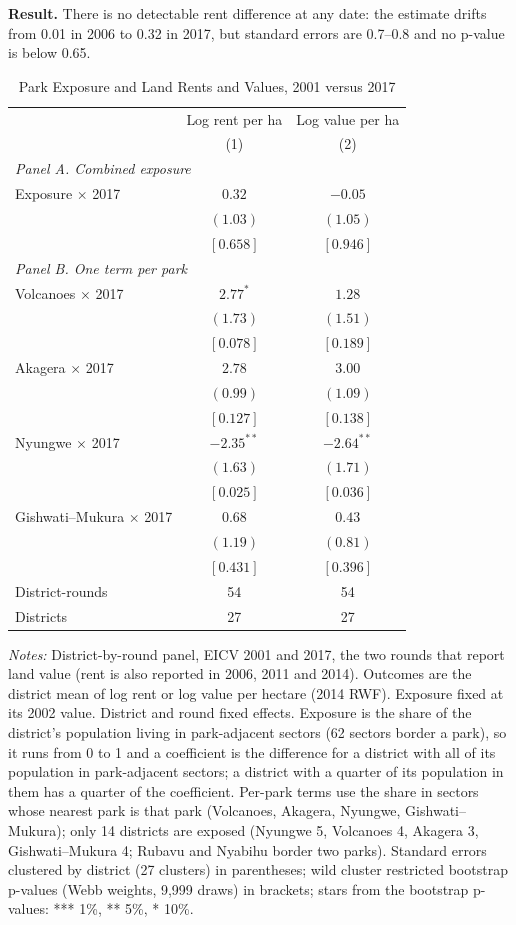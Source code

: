 \documentclass[11pt]{article}
\begin{document}
\textbf{Result.} There is no detectable rent difference at any date: the estimate drifts from 0.01 in 2006 to 0.32 in 2017, but standard errors are 0.7--0.8 and no p-value is below 0.65.
\clearpage
\begin{table}[H]
\centering\small\setlength{\tabcolsep}{4pt}
\caption{Park Exposure and Land Rents and Values, 2001 versus 2017}
\label{tab:land_firstlast}
\begin{tabular}{lcc}
\toprule
 & Log rent per ha & Log value per ha \\
 & (1) & (2) \\
\midrule
\multicolumn{3}{l}{\textit{Panel A. Combined exposure}} \\
Exposure $\times$ 2017 & $0.32$ & $-0.05$ \\
 & $(1.03)$ & $(1.05)$ \\
 & $[0.658]$ & $[0.946]$ \\
\multicolumn{3}{l}{\textit{Panel B. One term per park}} \\
Volcanoes $\times$ 2017 & $2.77^{*}$ & $1.28$ \\
 & $(1.73)$ & $(1.51)$ \\
 & $[0.078]$ & $[0.189]$ \\
Akagera $\times$ 2017 & $2.78$ & $3.00$ \\
 & $(0.99)$ & $(1.09)$ \\
 & $[0.127]$ & $[0.138]$ \\
Nyungwe $\times$ 2017 & $-2.35^{**}$ & $-2.64^{**}$ \\
 & $(1.63)$ & $(1.71)$ \\
 & $[0.025]$ & $[0.036]$ \\
Gishwati--Mukura $\times$ 2017 & $0.68$ & $0.43$ \\
 & $(1.19)$ & $(0.81)$ \\
 & $[0.431]$ & $[0.396]$ \\
\midrule
District-rounds & 54 & 54 \\
Districts & 27 & 27 \\
\bottomrule
\end{tabular}
\begin{minipage}{0.95\textwidth}\footnotesize
\textit{Notes:} District-by-round panel, EICV 2001 and 2017, the two rounds that report land value (rent is also reported in 2006, 2011 and 2014). Outcomes are the district mean of log rent or log value per hectare (2014 RWF). Exposure fixed at its 2002 value. District and round fixed effects. Exposure is the share of the district's population living in park-adjacent sectors (62 sectors border a park), so it runs from 0 to 1 and a coefficient is the difference for a district with all of its population in park-adjacent sectors; a district with a quarter of its population in them has a quarter of the coefficient. Per-park terms use the share in sectors whose nearest park is that park (Volcanoes, Akagera, Nyungwe, Gishwati--Mukura); only 14 districts are exposed (Nyungwe 5, Volcanoes 4, Akagera 3, Gishwati--Mukura 4; Rubavu and Nyabihu border two parks). Standard errors clustered by district (27 clusters) in parentheses; wild cluster restricted bootstrap p-values (Webb weights, 9,999 draws) in brackets; stars from the bootstrap p-values: *** 1\%, ** 5\%, * 10\%.
\end{minipage}
\end{table}
\end{document}
